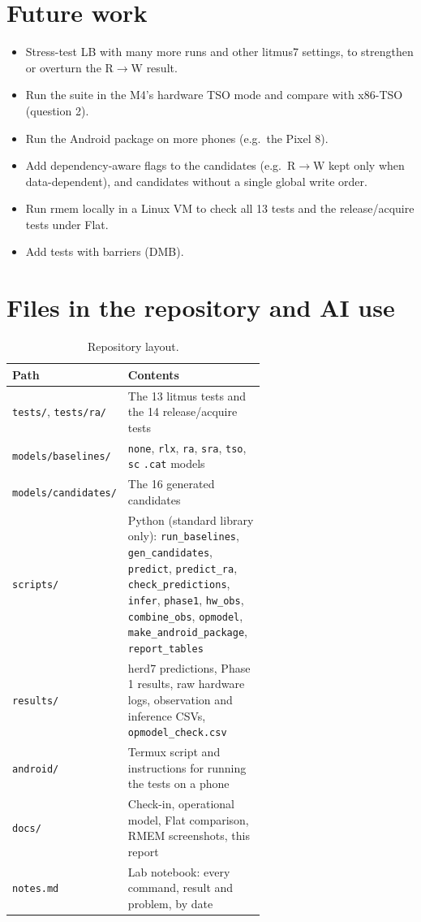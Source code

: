 \documentclass[11pt]{article}
\newcommand{\pair}[2]{#1$\to$#2}
\begin{document}
\section{Future work}
\begin{itemize}
  \item Stress-test LB with many more runs and other litmus7 settings, to strengthen or overturn the
        \pair{R}{W} result.
  \item Run the suite in the M4's hardware TSO mode and compare with x86-TSO (question 2).
  \item Run the Android package on more phones (e.g.\ the Pixel 8).
  \item Add dependency-aware flags to the candidates (e.g.\ \pair{R}{W} kept only when data-dependent),
        and candidates without a single global write order.
  \item Run rmem locally in a Linux VM to check all 13 tests and the release/acquire tests under Flat.
  \item Add tests with barriers (DMB).
\end{itemize}

\section{Files in the repository and AI use}

\begin{table}[h]
\centering\small
\begin{tabular}{lp{0.62\linewidth}}
\toprule
Path & Contents \\
\midrule
\texttt{tests/}, \texttt{tests/ra/} & The 13 litmus tests and the 14 release/acquire tests \\
\texttt{models/baselines/} & \texttt{none}, \texttt{rlx}, \texttt{ra}, \texttt{sra}, \texttt{tso}, \texttt{sc} \texttt{.cat} models \\
\texttt{models/candidates/} & The 16 generated candidates \\
\texttt{scripts/} & Python (standard library only): \texttt{run\_baselines}, \texttt{gen\_candidates}, \texttt{predict},
  \texttt{predict\_ra}, \texttt{check\_predictions}, \texttt{infer}, \texttt{phase1}, \texttt{hw\_obs}, \texttt{combine\_obs},
  \texttt{opmodel}, \texttt{make\_android\_package}, \texttt{report\_tables} \\
\texttt{results/} & herd7 predictions, Phase 1 results, raw hardware logs, observation and inference CSVs,
  \texttt{opmodel\_check.csv} \\
\texttt{android/} & Termux script and instructions for running the tests on a phone \\
\texttt{docs/} & Check-in, operational model, Flat comparison, RMEM screenshots, this report \\
\texttt{notes.md} & Lab notebook: every command, result and problem, by date \\
\bottomrule
\end{tabular}
\caption{Repository layout.}
\label{tab:files}
\end{table}
\end{document}
